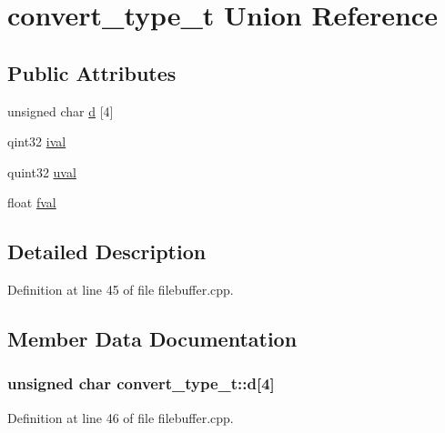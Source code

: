 \hypertarget{unionconvert__type__t}{}\section{convert\+\_\+type\+\_\+t Union Reference}
\label{unionconvert__type__t}
\subsection*{Public Attributes}
\begin{DoxyCompactItemize}
\item 
unsigned char \hyperlink{unionconvert__type__t_a4fcd24be201830134d26395d6472f105}{d} \mbox{[}4\mbox{]}
\item 
qint32 \hyperlink{unionconvert__type__t_a23001696f165130f03d305c2bc1442eb}{ival}
\item 
quint32 \hyperlink{unionconvert__type__t_a589a9a481a1889a166442e985519ac7c}{uval}
\item 
float \hyperlink{unionconvert__type__t_aa56281b3a5e206689c30ce623aa6dc0b}{fval}
\end{DoxyCompactItemize}


\subsection{Detailed Description}


Definition at line 45 of file filebuffer.\+cpp.



\subsection{Member Data Documentation}
\subsubsection[{\texorpdfstring{d}{d}}]{\setlength{\rightskip}{0pt plus 5cm}unsigned char convert\+\_\+type\+\_\+t\+::d\mbox{[}4\mbox{]}}\hypertarget{unionconvert__type__t_a4fcd24be201830134d26395d6472f105}{}\label{unionconvert__type__t_a4fcd24be201830134d26395d6472f105}


Definition at line 46 of file filebuffer.\+cpp.

